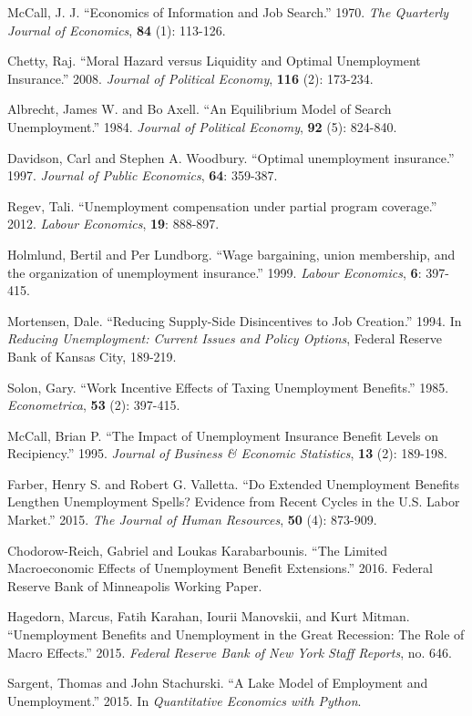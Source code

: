 \documentclass[12pt]{article}
\begin{document}

% 
\begin{thebibliography}{9}
	\singlespacing
	
	McCall, J. J.
	``Economics of Information and Job Search.'' 1970.
	\textit{The Quarterly Journal of Economics}, \textbf{84} (1): 113-126.
	
	Chetty, Raj.
	``Moral Hazard versus Liquidity and Optimal Unemployment Insurance.'' 2008.
	\textit{Journal of Political Economy}, \textbf{116} (2): 173-234.
	
	Albrecht, James W. and Bo Axell.
	``An Equilibrium Model of Search Unemployment.'' 1984.
	\textit{Journal of Political Economy}, \textbf{92} (5): 824-840.
	
	Davidson, Carl and Stephen A. Woodbury.
	``Optimal unemployment insurance.'' 1997.
	\textit{Journal of Public Economics}, \textbf{64}: 359-387.
	
	Regev, Tali.
	``Unemployment compensation under partial program coverage.'' 2012.
	\textit{Labour Economics}, \textbf{19}: 888-897.
	
	Holmlund, Bertil and Per Lundborg.
	``Wage bargaining, union membership, and the organization of unemployment insurance.'' 1999.
	\textit{Labour Economics}, \textbf{6}: 397-415.
	
	Mortensen, Dale.
	``Reducing Supply-Side Disincentives to Job Creation.'' 1994.
	In \textit{Reducing Unemployment: Current Issues and Policy Options}, Federal Reserve Bank of Kansas City, 189-219.
	
	Solon, Gary.
	``Work Incentive Effects of Taxing Unemployment Benefits.'' 1985.
	\textit{Econometrica}, \textbf{53} (2): 397-415.
	
	McCall, Brian P.
	``The Impact of Unemployment Insurance Benefit Levels on Recipiency.'' 1995.
	\textit{Journal of Business \& Economic Statistics}, \textbf{13} (2): 189-198.
	
	Farber, Henry S. and Robert G. Valletta.
	``Do Extended Unemployment Benefits Lengthen Unemployment Spells? Evidence from Recent Cycles in the U.S. Labor Market.'' 2015.
	\textit{The Journal of Human Resources}, \textbf{50} (4): 873-909.
	
	Chodorow-Reich, Gabriel and Loukas Karabarbounis.
	``The Limited Macroeconomic Effects of Unemployment Benefit Extensions.'' 2016.
	Federal Reserve Bank of Minneapolis Working Paper.
	
	Hagedorn, Marcus, Fatih Karahan, Iourii Manovskii, and Kurt Mitman.
	``Unemployment Benefits and Unemployment in the Great Recession: The Role of Macro Effects.'' 2015.
	\emph{Federal Reserve Bank of New York Staff Reports}, no. 646.
	
	Sargent, Thomas and John Stachurski.
	``A Lake Model of Employment and Unemployment.'' 2015.
	In \emph{Quantitative Economics with Python}.
	
\end{thebibliography}


 
\end{document}

